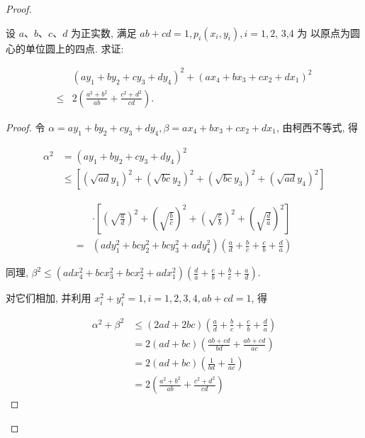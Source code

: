 \begin{proof}
\begin{example}
\begin{solution}
\begin{note}
\begin{solution}
\begin{example}
	设 $a 、 b 、 c 、 d$ 为正实数, 满足 $a b+c d=1, p_{i}\left(x_{i}, y_{i}\right), i=1,2$, 3,4 为 以原点为圆心的单位圆上的四点. 求证:
	
	$$
	\begin{aligned}
	& \left(a y_{1}+b y_{2}+c y_{3}+d y_{4}\right)^{2}+\left(a x_{4}+b x_{3}+c x_{2}+d x_{1}\right)^{2} \\
	\leqslant & 2\left(\frac{a^{2}+b^{2}}{a b}+\frac{c^{2}+d^{2}}{c d}\right) .
	\end{aligned}
	$$
\end{example}
\begin{proof}
	令 $\alpha=a y_{1}+b y_{2}+c y_{3}+d y_{4}, \beta=a x_{4}+b x_{3}+c x_{2}+d x_{1}$, 由柯西不等式, 得
	
	$$
	\begin{aligned}
	\alpha^{2} & =\left(a y_{1}+b y_{2}+c y_{3}+d y_{4}\right)^{2} \\
	& \leqslant\left[\left(\sqrt{a d} y_{1}\right)^{2}+\left(\sqrt{b c} y_{2}\right)^{2}+\left(\sqrt{b c} y_{3}\right)^{2}+\left(\sqrt{a d} y_{4}\right)^{2}\right]
	\end{aligned}
	$$
	
	$$
	\begin{aligned}
	& \cdot\left[\left(\sqrt{\frac{a}{d}}\right)^{2}+\left(\sqrt{\frac{b}{c}}\right)^{2}+\left(\sqrt{\frac{c}{b}}\right)^{2}+\left(\sqrt{\frac{d}{a}}\right)^{2}\right] \\
	= & \left(a d y_{1}^{2}+b c y_{2}^{2}+b c y_{3}^{2}+a d y_{4}^{2}\right)\left(\frac{a}{d}+\frac{b}{c}+\frac{c}{b}+\frac{d}{a}\right)
	\end{aligned}
	$$
	
	同理, $\beta^{2} \leqslant\left(a d x_{4}^{2}+b c x_{3}^{2}+b c x_{2}^{2}+a d x_{1}^{2}\right)\left(\frac{d}{a}+\frac{c}{b}+\frac{b}{c}+\frac{a}{d}\right)$.
	
	对它们相加, 并利用 $x_{i}^{2}+y_{i}^{2}=1, i=1,2,3,4, a b+c d=1$, 得
	
	$$
	\begin{aligned}
	\alpha^{2}+\beta^{2} & \leqslant(2 a d+2 b c)\left(\frac{a}{d}+\frac{b}{c}+\frac{c}{b}+\frac{d}{a}\right) \\
	& =2(a d+b c)\left(\frac{a b+c d}{b d}+\frac{a b+c d}{a c}\right) \\
	& =2(a d+b c)\left(\frac{1}{b d}+\frac{1}{a c}\right) \\
	& =2\left(\frac{a^{2}+b^{2}}{a b}+\frac{c^{2}+d^{2}}{c d}\right)
	\end{aligned}
	$$
	

\end{proof}
\end{solution}
\end{note}
\end{solution}
\end{example}
\end{proof}
